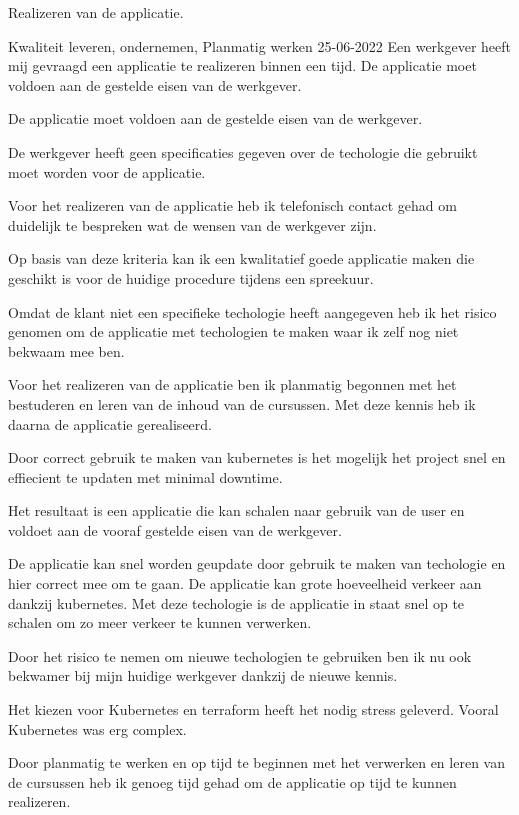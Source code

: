 {%
	\bewijs
	{%
		Realizeren van de applicatie.
	}
	{%
		\starr
		{%
			Kwaliteit leveren,
			ondernemen,
			Planmatig werken
		}
		{%
			25-06-2022
		}
		{%
			Een werkgever heeft mij gevraagd een applicatie te realizeren binnen een tijd.
			De applicatie moet voldoen aan de gestelde eisen van de werkgever.
		}
		{%
			De applicatie moet voldoen aan de gestelde eisen van de werkgever.

			De werkgever heeft geen specificaties gegeven over de techologie die gebruikt moet worden voor de applicatie.

		}
		{%
			Voor het realizeren van de applicatie heb ik telefonisch contact gehad om duidelijk te bespreken wat de wensen van de werkgever zijn.

			Op basis van deze kriteria kan ik een kwalitatief goede applicatie maken die geschikt is voor de huidige procedure tijdens een spreekuur.

			Omdat de klant niet een specifieke techologie heeft aangegeven heb ik het risico genomen om de applicatie met techologien te maken waar ik zelf nog niet bekwaam mee ben.

			Voor het realizeren van de applicatie ben ik planmatig begonnen met het bestuderen en leren van de inhoud van de cursussen.
			Met deze kennis heb ik daarna de applicatie gerealiseerd.

			Door correct gebruik te maken van kubernetes is het mogelijk het project snel en effiecient te updaten met minimal downtime.

		}
		{%
			Het resultaat is een applicatie die kan schalen naar gebruik van de user en voldoet aan de vooraf gestelde eisen van de werkgever.

			De applicatie kan snel worden geupdate door gebruik te maken van techologie en hier correct mee om te gaan.
			De applicatie kan grote hoeveelheid verkeer aan dankzij kubernetes.
			Met deze techologie is de applicatie in staat snel op te schalen om zo meer verkeer te kunnen verwerken.

			Door het risico te nemen om nieuwe techologien te gebruiken ben ik nu ook bekwamer bij mijn huidige werkgever dankzij de nieuwe kennis.
		}
		{%

			Het kiezen voor Kubernetes en terraform heeft het nodig stress geleverd.
			Vooral Kubernetes was erg complex.

			Door planmatig te werken en op tijd te beginnen met het verwerken en leren van de cursussen heb ik genoeg tijd gehad om de applicatie op tijd te kunnen realizeren.

}}}
